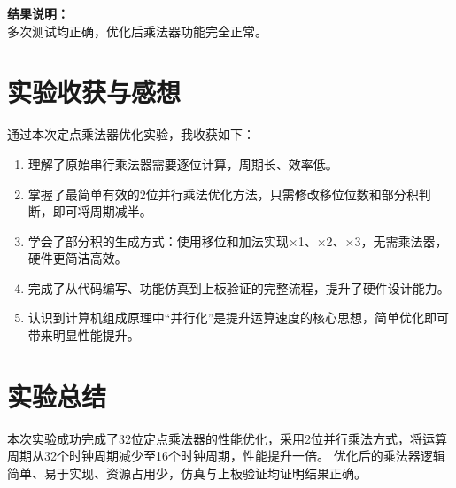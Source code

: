 \documentclass[12pt,a4paper]{article}
\begin{document}
\textbf{结果说明：} \\
多次测试均正确，优化后乘法器功能完全正常。

\section{实验收获与感想}
通过本次定点乘法器优化实验，我收获如下：
\begin{enumerate}
    \item 理解了原始串行乘法器需要逐位计算，周期长、效率低。
    \item 掌握了最简单有效的2位并行乘法优化方法，只需修改移位位数和部分积判断，即可将周期减半。
    \item 学会了部分积的生成方式：使用移位和加法实现×1、×2、×3，无需乘法器，硬件更简洁高效。
    \item 完成了从代码编写、功能仿真到上板验证的完整流程，提升了硬件设计能力。
    \item 认识到计算机组成原理中“并行化”是提升运算速度的核心思想，简单优化即可带来明显性能提升。
\end{enumerate}

\section{实验总结}
本次实验成功完成了32位定点乘法器的性能优化，采用2位并行乘法方式，将运算周期从32个时钟周期减少至16个时钟周期，性能提升一倍。
优化后的乘法器逻辑简单、易于实现、资源占用少，仿真与上板验证均证明结果正确。
\end{document}
